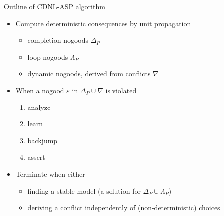 \begin{frame}{Outline of CDNL-ASP algorithm}
  \begin{itemize}
  \item<2-> Compute deterministic consequences by unit propagation
    \begin{itemize}
    \item completion nogoods                                         \hfill $\Delta_P$
    \item<2-5,7-> loop nogoods \hfill $\Lambda_P$\kern 1pt
    \item<3-> dynamic nogoods, derived from \alert<3>{conflicts} \hfill $\nabla\phantom{_P}$
    \end{itemize}
  \item<8-> When a nogood $\varepsilon$ in $\Delta_P\cup\nabla$ is \alert<7>{violated}
    \begin{enumerate}
    \item<9-> \alert<9-13>{analyze}
    \item<9-> \alert<9-13>{learn}
    \item<9-> \alert<9-13>{backjump}
    \item<9-> \alert<9-13>{assert}
    \end{enumerate}
    \item<16-> Terminate when either
    \begin{itemize}
    \item<17-> finding a stable model (a solution for $\Delta_P\cup\Lambda_P$)
    \item<18-> deriving a conflict independently of (non-deterministic) choices
    \end{itemize}
  \end{itemize}
\end{frame}
